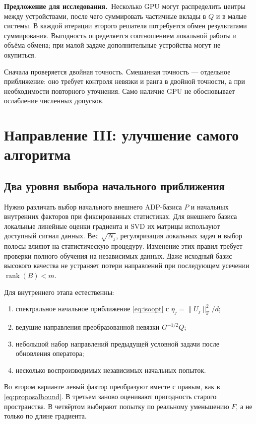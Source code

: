 \documentclass[11pt,a4paper]{article}
\numberwithin{equation}{section}
\theoremstyle{remark}
\newcommand{\F}{_{\mathrm F}}
\DeclareMathOperator{\rank}{rank}
\newcommand{\proposal}{\par\noindent\textbf{Предложение для исследования.}\ }
\begin{document}
\proposal Несколько GPU могут распределить центры между устройствами,
после чего суммировать частичные вклады в $Q$ и в малые системы.
В каждой итерации второго решателя потребуется обмен результатами
суммирования. Выгодность определяется соотношением локальной работы и
объёма обмена; при малой задаче дополнительные устройства могут не окупиться.

Сначала проверяется двойная точность. Смешанная точность --- отдельное
приближение: оно требует контроля невязки и ранга в двойной точности,
а при необходимости повторного уточнения. Само наличие GPU не обосновывает
ослабление численных допусков.

\section{Направление III: улучшение самого алгоритма}\label{sec:algorithm}

\subsection{Два уровня выбора начального приближения}
Нужно различать выбор начального внешнего ADP-базиса $P$ и начальных
внутренних факторов при фиксированных статистиках.
Для внешнего базиса локальные линейные оценки градиента и SVD их матрицы
используют доступный сигнал данных. Вес $\sqrt{N_j}$, регуляризация
локальных задач и выбор полосы влияют на статистическую процедуру.
Изменение этих правил требует проверки полного обучения на независимых
данных. Даже исходный базис высокого качества не устраняет потери
направлений при последующем усечении $\rank(B)<m$.

Для внутреннего этапа естественны:
\begin{enumerate}
 \item спектральное начальное приближение \eqref{eq:isoopt} с
 $\eta_j=\|U_j\|\F^2/d$;
 \item ведущие направления преобразованной невязки $G^{-1/2}Q$;
 \item небольшой набор направлений предыдущей условной задачи после
 обновления оператора;
 \item несколько воспроизводимых независимых начальных попыток.
\end{enumerate}
Во втором варианте левый фактор преобразуют вместе с правым, как
в \eqref{eq:proposalbound}. В третьем заново оценивают пригодность старого
пространства. В четвёртом выбирают попытку по реальному уменьшению $F$,
а не только по длине градиента.
\end{document}

